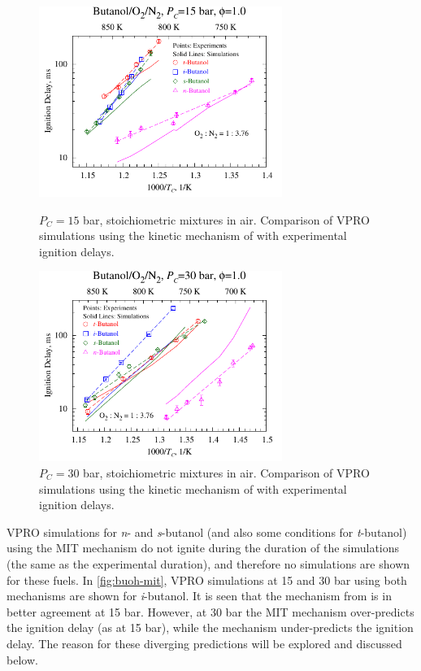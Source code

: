 \documentclass[12pt, letterpaper]{article}
\begin{document}
\begin{figure}
    \centering
    \begin{minipage}{7.9cm}
        \includegraphics[width=7.9cm]{03-Butanol/buoh-15sim}
        \caption{$P_C=15$ bar, stoichiometric mixtures in air. Comparison of
            VPRO simulations using the kinetic mechanism of
            \textcite{Sarathy2012} with experimental ignition delays.}
        \label{fig:buoh-15sim}
    \end{minipage}
    \quad
    \begin{minipage}{7.9cm}
        \includegraphics[width=7.9cm]{03-Butanol/buoh-30sim}
        \caption{$P_C=30$ bar, stoichiometric mixtures in air. Comparison of
            VPRO simulations using the kinetic mechanism of
            \textcite{Sarathy2012} with experimental ignition delays.}
        \label{fig:buoh-30sim}
    \end{minipage}
\end{figure}

VPRO simulations for \textit{n}- and \textit{s}-butanol (and also some
conditions for \textit{t}-butanol) using the MIT mechanism
\cite{Hansen2013,Merchant2013} do not ignite during the duration of the
simulations (the same as the experimental duration), and therefore no
simulations are shown for these fuels. In \autoref{fig:buoh-mit}, VPRO
simulations at 15 and 30 bar using both mechanisms are shown for
\textit{i}-butanol. It is seen that the mechanism from \textcite{Sarathy2012}
is in better agreement at 15 bar. However, at 30 bar the MIT mechanism
\cite{Hansen2013,Merchant2013} over-predicts the ignition delay (as at 15 bar),
while the \textcite{Sarathy2012} mechanism under-predicts the ignition delay.
The reason for these diverging predictions will be explored and discussed below.
\end{document}
